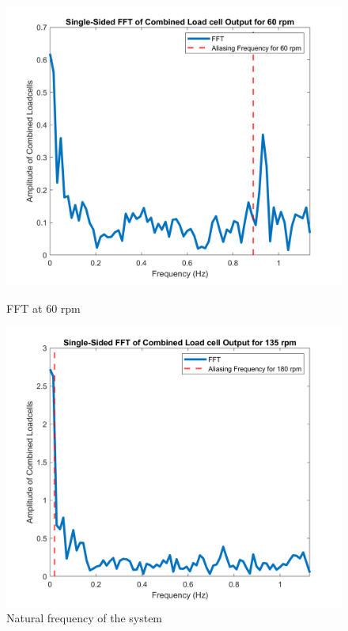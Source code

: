         \begin{figure}[h]
            \centering
            \begin{minipage}{0.45\textwidth}
                \centering
                \includegraphics*[width =1.1\textwidth]{figs/Data_Analysis/FFT-TEST 0 60.2.png}
                \caption{FFT at 60 rpm}
                \label{fig: fft_60}
            \end{minipage}\hfill
            \begin{minipage}{0.45\textwidth}
                \centering
                \includegraphics*[width =1.1\textwidth]{figs/Data_Analysis/FFT-Test 4.png}
                \caption{Natural frequency of the system} 
                \label{fig: fft_nat_freq}
            \end{minipage}
        \end{figure} 
        
